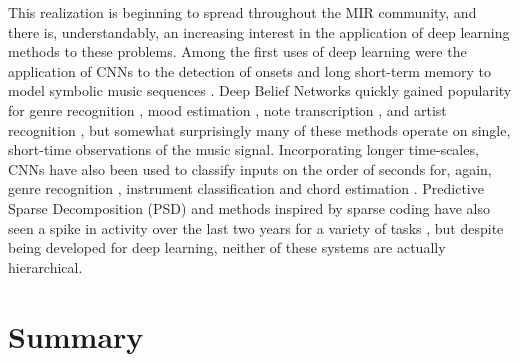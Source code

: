 This realization is beginning to spread throughout the MIR community, and there is, understandably, an increasing interest in the application of deep learning methods to these problems.
Among the first uses of deep learning were the application of CNNs to the detection of onsets \cite{Lacoste2007} and long short-term memory to model symbolic music sequences \cite{Eck2008}.
Deep Belief Networks quickly gained popularity for genre recognition \cite{Hamel2009}, mood estimation \cite{Schmidt2011}, note transcription \cite{Nam2011}, and artist recognition \cite{Dieleman2011}, but somewhat surprisingly many of these methods operate on single, short-time observations of the music signal.
Incorporating longer time-scales, CNNs have also been used to classify inputs on the order of seconds for, again, genre recognition \cite{Li2010}, instrument classification \cite{Humphrey2010} and chord estimation \cite{Humphrey2011, Humphrey2012b}.
Predictive Sparse Decomposition (PSD) and methods inspired by sparse coding have also seen a spike in activity over the last two years for a variety of tasks \cite{Henaff2011, Nam2012}, but despite being developed for deep learning, neither of these systems are actually hierarchical.


\section{Summary}
